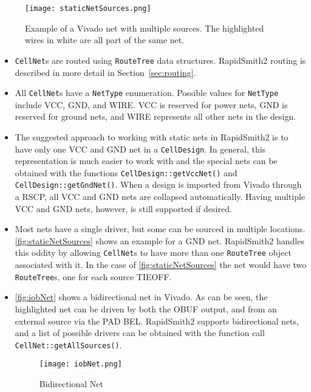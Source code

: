   \begin{figure}[h]
   \centering
   \texttt{[image: staticNetSources.png]}
   \caption{Example of a Vivado net with multiple sources. The highlighted
   wires in white are all part of the same net.}
   \label{fig:staticNetSources}
  \end{figure}
  
\begin{itemize}
  \item \texttt{CellNet}s are routed using \texttt{RouteTree} data structures.
  RapidSmith2 routing is described in more detail in Section~\ref{sec:routing}.
  
  \item All \texttt{CellNet}s have a \texttt{NetType} enumeration. Possible values for
  \texttt{NetType} include VCC, GND, and WIRE. VCC is reserved for power nets, GND
  is reserved for ground nets, and WIRE represents all other nets in the design.
  
  \item The suggested approach to working with static nets in RapidSmith2 is to
  have only one VCC and GND net in a \texttt{CellDesign}. In general, this
  representation is much easier to work with and the special nets
  can be obtained with the functions \texttt{CellDesign::getVccNet()}
  and \texttt{CellDesign::getGndNet()}. When a design is imported from Vivado
  through a RSCP, all VCC and GND nets are collapsed automatically. Having
  multiple VCC and GND nets, however, is still supported if desired.
  
  \item Most nets have a single driver, but some can be sourced in multiple
  locations. \autoref{fig:staticNetSources} shows an example for a GND
  net. RapidSmith2 handles this oddity by allowing \texttt{CellNet}s to have
  more than one \texttt{RouteTree} object associated with it. In the case of
  \autoref{fig:staticNetSources} the net would have two \texttt{RouteTree}s,
  one for each source TIEOFF.
  
  \item \autoref{fig:iobNet} shows a bidirectional net in Vivado. As can be
  seen, the highlighted net can be driven by both the OBUF output, and from an
  external source via the PAD BEL. RapidSmith2 supports bidirectional nets, 
  and a list of possible drivers can be obtained with the function call
  \texttt{CellNet::getAllSources()}.
  
  \begin{figure}[H]
   \centering
   \texttt{[image: iobNet.png]}
   \caption{Bidirectional Net}
   \label{fig:iobNet}
  \end{figure}


\end{itemize}
